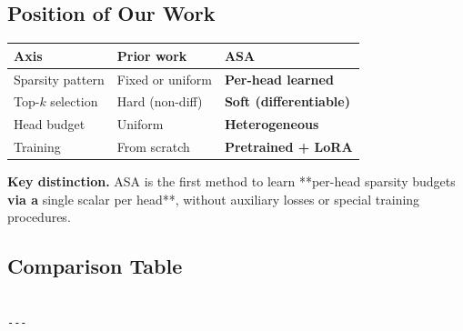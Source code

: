 \subsection{Position of Our Work}

\begin{table}[H]
\centering
\small
\begin{tabular}{lll}
\toprule
\textbf{Axis} & \textbf{Prior work} & \textbf{ASA} \\
\midrule
Sparsity pattern & Fixed or uniform & \textbf{Per-head learned} \\
Top-$k$ selection & Hard (non-diff) & \textbf{Soft (differentiable)} \\
Head budget & Uniform & \textbf{Heterogeneous} \\
Training & From scratch & \textbf{Pretrained + LoRA} \\
\bottomrule
\end{tabular}
\end{table}

\textbf{Key distinction.} ASA is the first method to learn **per-head sparsity 
budgets\textbf{ via a }single scalar per head**, without auxiliary losses or 
special training procedures.

\subsection{Comparison Table}

\begin{lstlisting}

---
\end{lstlisting}